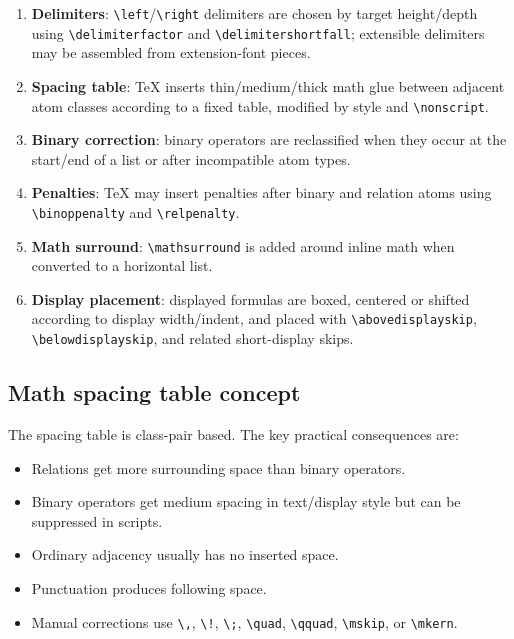 \documentclass[11pt]{article}
\newcommand{\tightlist}{}
\begin{document}
\begin{enumerate}
\item
  \textbf{Delimiters}: \texttt{\textbackslash{}left}/\texttt{\textbackslash{}right} delimiters are chosen by target height/depth using \texttt{\textbackslash{}delimiterfactor} and \texttt{\textbackslash{}delimitershortfall}; extensible delimiters may be assembled from extension-font pieces.
\item
  \textbf{Spacing table}: TeX inserts thin/medium/thick math glue between adjacent atom classes according to a fixed table, modified by style and \texttt{\textbackslash{}nonscript}.
\item
  \textbf{Binary correction}: binary operators are reclassified when they occur at the start/end of a list or after incompatible atom types.
\item
  \textbf{Penalties}: TeX may insert penalties after binary and relation atoms using \texttt{\textbackslash{}binoppenalty} and \texttt{\textbackslash{}relpenalty}.
\item
  \textbf{Math surround}: \texttt{\textbackslash{}mathsurround} is added around inline math when converted to a horizontal list.
\item
  \textbf{Display placement}: displayed formulas are boxed, centered or shifted according to display width/indent, and placed with \texttt{\textbackslash{}abovedisplayskip}, \texttt{\textbackslash{}belowdisplayskip}, and related short-display skips.
\end{enumerate}

\subsection{Math spacing table concept}\label{math-spacing-table-concept}

The spacing table is class-pair based. The key practical consequences are:

\begin{itemize}
\tightlist
\item
  Relations get more surrounding space than binary operators.
\item
  Binary operators get medium spacing in text/display style but can be suppressed in scripts.
\item
  Ordinary adjacency usually has no inserted space.
\item
  Punctuation produces following space.
\item
  Manual corrections use \texttt{\textbackslash{},}, \texttt{\textbackslash!}, \texttt{\textbackslash{};}, \texttt{\textbackslash{}quad}, \texttt{\textbackslash{}qquad}, \texttt{\textbackslash{}mskip}, or \texttt{\textbackslash{}mkern}.
\end{itemize}
\end{document}
